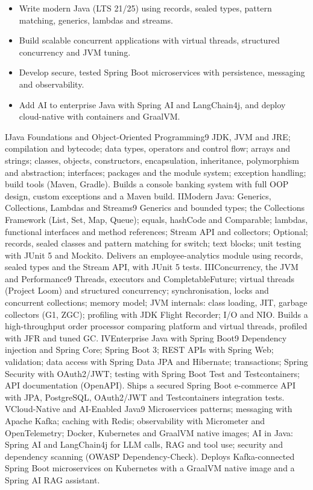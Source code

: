 \begin{itemize}
\item Write modern Java (LTS 21/25) using records, sealed types, pattern matching, generics, lambdas and streams.
\item Build scalable concurrent applications with virtual threads, structured concurrency and JVM tuning.
\item Develop secure, tested Spring Boot microservices with persistence, messaging and observability.
\item Add AI to enterprise Java with Spring AI and LangChain4j, and deploy cloud-native with containers and GraalVM.
\end{itemize}

\unit{I}{Java Foundations and Object-Oriented Programming}{9}{%
JDK, JVM and JRE; compilation and bytecode; data types, operators and control flow; arrays and strings;
classes, objects, constructors, encapsulation, inheritance, polymorphism and abstraction; interfaces;
packages and the module system; exception handling; build tools (Maven, Gradle).}
{Builds a console banking system with full OOP design, custom exceptions and a Maven build.}
\unit{II}{Modern Java: Generics, Collections, Lambdas and Streams}{9}{%
Generics and bounded types; the Collections Framework (List, Set, Map, Queue); equals, hashCode and Comparable;
lambdas, functional interfaces and method references; Stream API and collectors; Optional;
records, sealed classes and pattern matching for switch; text blocks; unit testing with JUnit 5 and Mockito.}
{Delivers an employee-analytics module using records, sealed types and the Stream API, with JUnit 5 tests.}
\unit{III}{Concurrency, the JVM and Performance}{9}{%
Threads, executors and CompletableFuture; virtual threads (Project Loom) and structured concurrency;
synchronisation, locks and concurrent collections; memory model; JVM internals: class loading, JIT, garbage collectors (G1, ZGC);
profiling with JDK Flight Recorder; I/O and NIO.}
{Builds a high-throughput order processor comparing platform and virtual threads, profiled with JFR and tuned GC.}
\unit{IV}{Enterprise Java with Spring Boot}{9}{%
Dependency injection and Spring Core; Spring Boot 3; REST APIs with Spring Web; validation; data access with Spring Data JPA and Hibernate;
transactions; Spring Security with OAuth2/JWT; testing with Spring Boot Test and Testcontainers; API documentation (OpenAPI).}
{Ships a secured Spring Boot e-commerce API with JPA, PostgreSQL, OAuth2/JWT and Testcontainers integration tests.}
\unit{V}{Cloud-Native and AI-Enabled Java}{9}{%
Microservices patterns; messaging with Apache Kafka; caching with Redis; observability with Micrometer and OpenTelemetry;
Docker, Kubernetes and GraalVM native images; AI in Java: Spring AI and LangChain4j for LLM calls, RAG and tool use;
security and dependency scanning (OWASP Dependency-Check).}
{Deploys Kafka-connected Spring Boot microservices on Kubernetes with a GraalVM native image and a Spring AI RAG assistant.}

